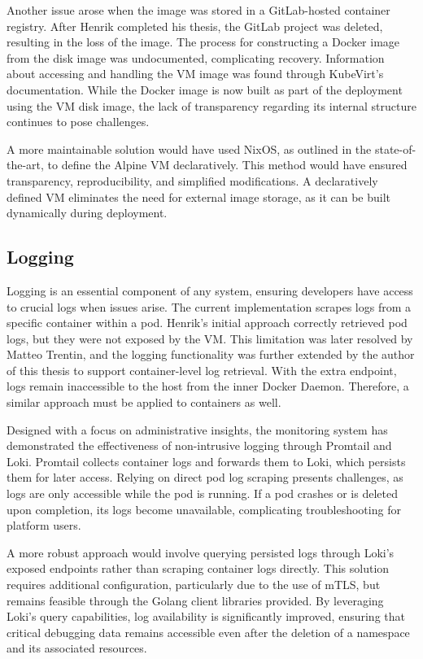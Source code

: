 Another issue arose when the image was stored in a GitLab-hosted container registry. After Henrik completed his thesis, the GitLab project was deleted, resulting in the loss of the image. The process for constructing a Docker image from the disk image was undocumented, complicating recovery. Information about accessing and handling the VM image was found through KubeVirt's documentation. While the Docker image is now built as part of the deployment using the VM disk image, the lack of transparency regarding its internal structure continues to pose challenges.

A more maintainable solution would have used NixOS, as outlined in the state-of-the-art, to define the Alpine VM declaratively. This method would have ensured transparency, reproducibility, and simplified modifications. A declaratively defined VM eliminates the need for external image storage, as it can be built dynamically during deployment.

\subsection{Logging} 
Logging is an essential component of any system, ensuring developers have access to crucial logs when issues arise. The current implementation scrapes logs from a specific container within a pod. Henrik's initial approach correctly retrieved pod logs, but they were not exposed by the VM. This limitation was later resolved by Matteo Trentin, and the logging functionality was further extended by the author of this thesis to support container-level log retrieval. With the extra endpoint, logs remain inaccessible to the host from the inner Docker Daemon. Therefore, a similar approach must be applied to containers as well.

Designed with a focus on administrative insights, the monitoring system has demonstrated the effectiveness of non-intrusive logging through Promtail and Loki. Promtail collects container logs and forwards them to Loki, which persists them for later access. Relying on direct pod log scraping presents challenges, as logs are only accessible while the pod is running. If a pod crashes or is deleted upon completion, its logs become unavailable, complicating troubleshooting for platform users.

A more robust approach would involve querying persisted logs through Loki's exposed endpoints rather than scraping container logs directly. This solution requires additional configuration, particularly due to the use of mTLS, but remains feasible through the Golang client libraries provided. By leveraging Loki's query capabilities, log availability is significantly improved, ensuring that critical debugging data remains accessible even after the deletion of a namespace and its associated resources.

